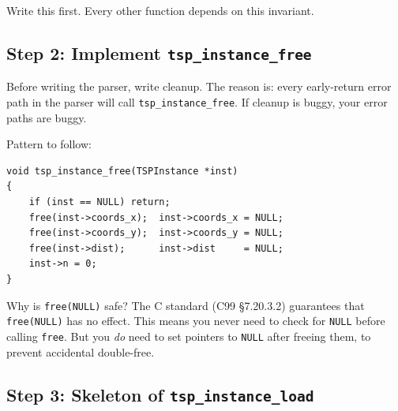 Write this first. Every other function depends on this invariant.

\subsection{Step 2: Implement \texttt{tsp\_instance\_free}}

Before writing the parser, write cleanup. The reason is: every early-return error path in the parser will call \texttt{tsp\_instance\_free}. If cleanup is buggy, your error paths are buggy.

Pattern to follow:

\begin{lstlisting}[style=cstyle]
void tsp_instance_free(TSPInstance *inst)
{
    if (inst == NULL) return;
    free(inst->coords_x);  inst->coords_x = NULL;
    free(inst->coords_y);  inst->coords_y = NULL;
    free(inst->dist);      inst->dist     = NULL;
    inst->n = 0;
}
\end{lstlisting}

\begin{inquiry}{Why is \texttt{free(NULL)} safe?}
The C standard (C99 \S7.20.3.2) guarantees that \texttt{free(NULL)} has no effect. This means you never need to check for \texttt{NULL} before calling \texttt{free}. But you \emph{do} need to set pointers to \texttt{NULL} after freeing them, to prevent accidental double-free.
\end{inquiry}

\subsection{Step 3: Skeleton of \texttt{tsp\_instance\_load}}

